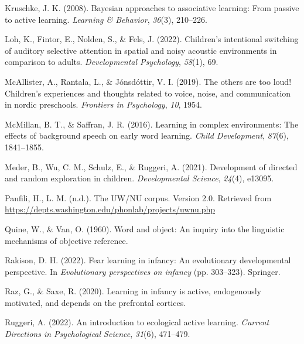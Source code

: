 \documentclass[10pt, letterpaper]{article}
\newenvironment{CSLReferences}%
  {}%
  {\par}
\begin{document}
\begin{CSLReferences}{1}{0}
\leavevmode{}%
Kruschke, J. K. (2008). Bayesian approaches to associative learning:
From passive to active learning. \emph{Learning \& Behavior},
\emph{36}(3), 210--226.

\leavevmode{}%
Loh, K., Fintor, E., Nolden, S., \& Fels, J. (2022). Children's
intentional switching of auditory selective attention in spatial and
noisy acoustic environments in comparison to adults. \emph{Developmental
Psychology}, \emph{58}(1), 69.

\leavevmode{}%
McAllister, A., Rantala, L., \& Jónsdóttir, V. I. (2019). The others are
too loud! Children's experiences and thoughts related to voice, noise,
and communication in nordic preschools. \emph{Frontiers in Psychology},
\emph{10}, 1954.

\leavevmode{}%
McMillan, B. T., \& Saffran, J. R. (2016). Learning in complex
environments: The effects of background speech on early word learning.
\emph{Child Development}, \emph{87}(6), 1841--1855.

\leavevmode{}%
Meder, B., Wu, C. M., Schulz, E., \& Ruggeri, A. (2021). Development of
directed and random exploration in children. \emph{Developmental
Science}, \emph{24}(4), e13095.

\leavevmode{}%
Panfili, H., L. M. (n.d.). The UW/NU corpus. Version 2.0. Retrieved from
\url{https://depts.washington.edu/phonlab/projects/uwnu.php}

\leavevmode{}%
Quine, W., \& Van, O. (1960). Word and object: An inquiry into the
linguistic mechanisms of objective reference.

\leavevmode{}%
Rakison, D. H. (2022). Fear learning in infancy: An evolutionary
developmental perspective. In \emph{Evolutionary perspectives on
infancy} (pp. 303--323). Springer.

\leavevmode{}%
Raz, G., \& Saxe, R. (2020). Learning in infancy is active, endogenously
motivated, and depends on the prefrontal cortices.

\leavevmode{}%
Ruggeri, A. (2022). An introduction to ecological active learning.
\emph{Current Directions in Psychological Science}, \emph{31}(6),
471--479.


\end{CSLReferences}
\end{document}
